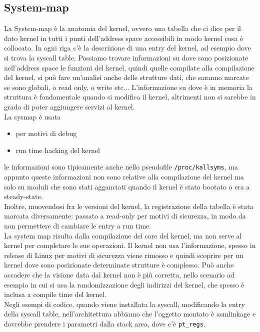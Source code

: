 \documentclass[12pt, oneside]{extbook}
\begin{document}
\subsection{System-map}
La System-map è la anatomia del kernel, ovvero una tabella che ci dice per il dato kernel in tutti i punti dell'address space accessibili in modo kernel cosa è collocato. In ogni riga c'è la descrizione di una entry del kernel, ad esempio dove si trova la syscall table. Possiamo trovare informazioni su dove sono posizionate nell'address space le funzioni del kernel, quindi quelle compilate alla compilazione del kernel, si può fare un'analisi anche delle strutture dati, che saranno marcate se sono globali, o read only, o write etc... L'informazione su dove è in memoria la struttura è fondamentale quando si modifica il kernel, altrimenti non si sarebbe in grado di poter aggiungere servizi al kernel.\\ La sysmap è usata
\begin{itemize}
\item per motivi di debug
\item run time hacking del kernel
\end{itemize}
le informazioni sono tipicamente anche nello pseudofile \texttt{/proc/kallsyms}, ma appunto queste informazioni non sono relative alla compilazione del kernel ma solo su moduli che sono stati agganciati quando il kernel è stato bootato o era a steady-state.\\ Inoltre, muovendosi fra le versioni del kernel, la registrazione della tabella è stata marcata diversamente: passato a read-only per motivi di sicurezza, in modo da non permettere di cambiare le entry a run time.\\ La system map risulta dalla compilazione del core del kernel, ma non serve al kernel per completare le sue operazioni. Il kernel non usa l'informazione, spesso in release di Linux per motivi di sicurezza viene rimosso e quindi scoprire per un kernel dove sono posizionate determinate strutture è complesso. Può anche accadere che la visione data dal kernel non è più corretta, nello scenario ad esempio in cui si usa la randomizzazione degli indirizzi del kernel, che spesso è inclusa a compile time del kernel.\\ Negli esempi di codice, quando viene installata la syscall, modificando la entry della syscall table, nell'architettura abbiamo che l'oggetto montato è asmlinkage e dovrebbe prendere i parametri dalla stack area, dove c'è \texttt{pt\_regs}.
\end{document}
